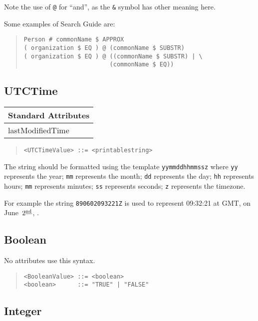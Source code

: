 Note the use of \verb+@+ for ``and'', as the \verb+&+ symbol has other meaning
here.

Some examples of Search Guide are:
\begin{quote}\begin{verbatim}
Person # commonName $ APPROX
( organization $ EQ ) @ (commonName $ SUBSTR)
( organization $ EQ ) @ ((commonName $ SUBSTR) | \
                        (commonName $ EQ))
\end{verbatim}\end{quote}

\subsection{UTCTime}
\begin{center}\small
\begin{tabular}{|l|}\hline
Standard Attributes \\ \hline
	lastModifiedTime\\
\hline
\end{tabular}
\end{center}
\begin{quote}\begin{verbatim}
<UTCTimeValue> ::= <printablestring>
\end{verbatim}\end{quote}
The string should be formatted using the template \verb+yymmddhhmmssz+
where 
\verb+yy+ represents the year; 
\verb+mm+ represents the month; 
\verb+dd+ represents the day; 
\verb+hh+ represents hours; 
\verb+mm+ represents minutes; 
\verb+ss+ represents seconds; 
\verb+z+  represents the timezone.

For example the string \verb+890602093221Z+ is used to represent
09:32:21 at GMT, on June~$2^{\underline{\mbox{\scriptsize nd}}}$,
{\oldstyle 1989}.

\subsection{Boolean}

No attributes use this syntax.

\begin{quote}\begin{verbatim}
<BooleanValue> ::= <boolean>
<boolean>      ::= "TRUE" | "FALSE"
\end{verbatim}\end{quote}

\subsection{Integer}

